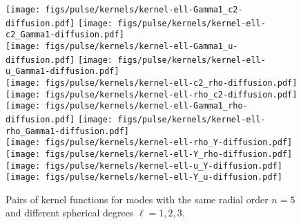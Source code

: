 \begin{figure}
    \centering
    \texttt{[image: figs/pulse/kernels/kernel-ell-Gamma1\_c2-diffusion.pdf]}%
    \texttt{[image: figs/pulse/kernels/kernel-ell-c2\_Gamma1-diffusion.pdf]}\\
    \texttt{[image: figs/pulse/kernels/kernel-ell-Gamma1\_u-diffusion.pdf]}%
    \texttt{[image: figs/pulse/kernels/kernel-ell-u\_Gamma1-diffusion.pdf]}\\
    \texttt{[image: figs/pulse/kernels/kernel-ell-c2\_rho-diffusion.pdf]}%
    \texttt{[image: figs/pulse/kernels/kernel-ell-rho\_c2-diffusion.pdf]}\\
    \texttt{[image: figs/pulse/kernels/kernel-ell-Gamma1\_rho-diffusion.pdf]}%
    \texttt{[image: figs/pulse/kernels/kernel-ell-rho\_Gamma1-diffusion.pdf]}\\
    \texttt{[image: figs/pulse/kernels/kernel-ell-rho\_Y-diffusion.pdf]}%
    \texttt{[image: figs/pulse/kernels/kernel-ell-Y\_rho-diffusion.pdf]}\\
    \texttt{[image: figs/pulse/kernels/kernel-ell-u\_Y-diffusion.pdf]}%
    \texttt{[image: figs/pulse/kernels/kernel-ell-Y\_u-diffusion.pdf]}
    \caption[Kernel functions (same $n$, different $\ell$)]{Pairs of kernel functions for modes with the same radial order ${n=5}$ and different spherical degrees ${\ell=1},2,3$. \label{fig:same-n}}
\end{figure}%
